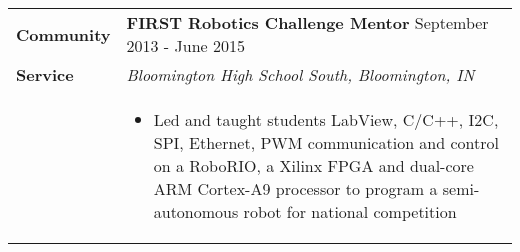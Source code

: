 \begin{tabular}{L{\hlcolw}  L{\rcolw}}
\textbf{\Large Community} & \textbf{\large FIRST Robotics Challenge Mentor } \hfill {\large September 2013 - June 2015}  \\

\textbf{\Large Service} & \textit{\large Bloomington High School South, Bloomington, IN} \\
& 
\vspace{-0.25in} 
\begin{itemize}[leftmargin = \itemmargin]
	\item Led and taught students LabView, C/C++, I2C, SPI, Ethernet, PWM communication and control on a RoboRIO, a Xilinx FPGA and dual-core ARM Cortex-A9 processor to program a semi-autonomous robot for national competition
\end{itemize} \\

	\hline \hline
\end{tabular}
